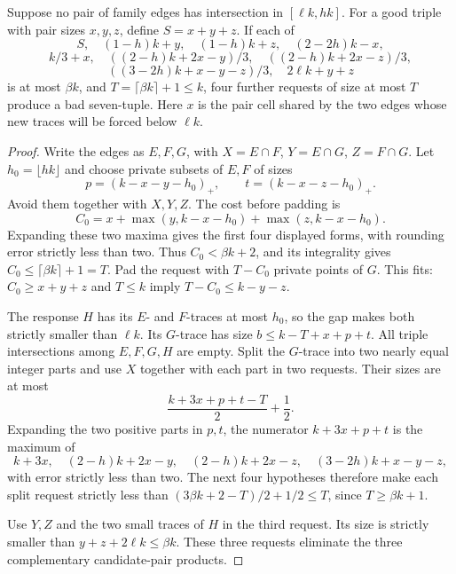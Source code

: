\begin{lemma}\label{lem:gapempty}
Suppose no pair of family edges has intersection in $[\ell k,hk]$. For a good triple with pair sizes $x,y,z$, define $S=x+y+z$. If each of
\[
S,\quad (1-h)k+y,\quad (1-h)k+z,\quad (2-2h)k-x,
\]
\[
k/3+x,\quad ((2-h)k+2x-y)/3,\quad ((2-h)k+2x-z)/3,
\]
\[
((3-2h)k+x-y-z)/3,\quad 2\ell k+y+z
\]
is at most $\beta k$, and $T=\lceil\beta k\rceil+1\le k$, four further requests of size at most $T$ produce a bad seven-tuple. Here $x$ is the pair cell shared by the two edges whose new traces will be forced below $\ell k$.
\end{lemma}
\begin{proof}
Write the edges as $E,F,G$, with $X=E\cap F$, $Y=E\cap G$, $Z=F\cap G$. Let $h_0=\lfloor hk\rfloor$ and choose private subsets of $E,F$ of sizes
\[
p=(k-x-y-h_0)_+,\qquad t=(k-x-z-h_0)_+.
\]
Avoid them together with $X,Y,Z$. The cost before padding is
\[
C_0=x+\max(y,k-x-h_0)+\max(z,k-x-h_0).
\]
Expanding these two maxima gives the first four displayed forms, with rounding error strictly less than two. Thus $C_0<\beta k+2$, and its integrality gives $C_0\le\lceil\beta k\rceil+1=T$. Pad the request with $T-C_0$ private points of $G$. This fits: $C_0\ge x+y+z$ and $T\le k$ imply $T-C_0\le k-y-z$.

The response $H$ has its $E$- and $F$-traces at most $h_0$, so the gap makes both strictly smaller than $\ell k$. Its $G$-trace has size $b\le k-T+x+p+t$. All triple intersections among $E,F,G,H$ are empty. Split the $G$-trace into two nearly equal integer parts and use $X$ together with each part in two requests. Their sizes are at most
\[
\frac{k+3x+p+t-T}{2}+\frac12.
\]
Expanding the two positive parts in $p,t$, the numerator $k+3x+p+t$ is the maximum of
\[
k+3x,\quad (2-h)k+2x-y,\quad (2-h)k+2x-z,\quad (3-2h)k+x-y-z,
\]
with error strictly less than two. The next four hypotheses therefore make each split request strictly less than $(3\beta k+2-T)/2+1/2\le T$, since $T\ge\beta k+1$.

Use $Y,Z$ and the two small traces of $H$ in the third request. Its size is strictly smaller than $y+z+2\ell k\le\beta k$. These three requests eliminate the three complementary candidate-pair products.
\end{proof}

